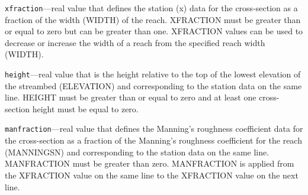 \begin{description}
\item \texttt{xfraction}---real value that defines the station (x) data for the cross-section as a fraction of the width (WIDTH) of the reach. XFRACTION must be greater than or equal to zero but can be greater than one. XFRACTION values can be used to decrease or increase the width of a reach from the specified reach width (WIDTH).

\item \texttt{height}---real value that is the height relative to the top of the lowest elevation of the streambed (ELEVATION) and corresponding to the station data on the same line. HEIGHT must be greater than or equal to zero and at least one cross-section height must be equal to zero.

\item \texttt{manfraction}---real value that defines the Manning's roughness coefficient data for the cross-section as a fraction of the Manning's roughness coefficient for the reach (MANNINGSN) and corresponding to the station data on the same line. MANFRACTION must be greater than zero. MANFRACTION is applied from the XFRACTION value on the same line to the XFRACTION value on the next line.

\end{description}

